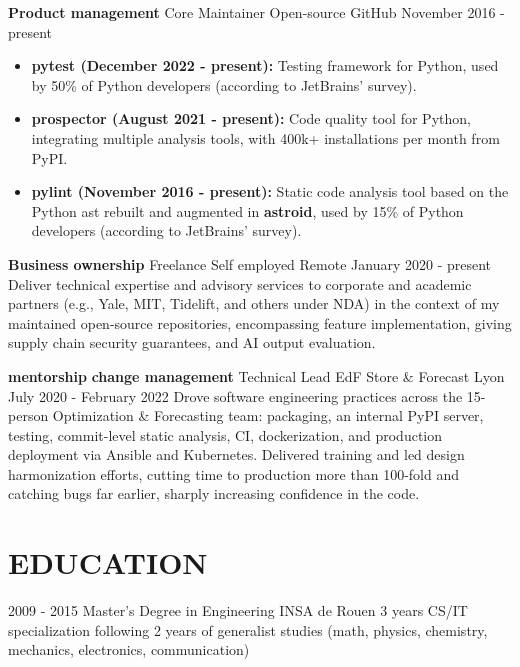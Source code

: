 \documentclass[11pt,a4paper]{moderncv}
\begin{document}
    \cventry
    {\textbf{Product management}}
    {Core Maintainer}
    {Open-source}
    {GitHub}
    {November 2016 - present}{
      \begin{itemize}
          \item \textbf{pytest (December 2022 - present):} Testing framework for Python, used by 50\% of Python developers (according to JetBrains' survey).
          \item \textbf{prospector (August 2021 - present):} Code quality tool for Python, integrating multiple analysis tools, with
            400k+ installations per month from PyPI.
          \item \textbf{pylint (November 2016 - present):} Static code analysis tool based on the Python ast
            rebuilt and augmented in \textbf{astroid}, used by 15\% of Python developers (according to JetBrains' survey).
      \end{itemize}
    }

    \cventry
    {\textbf{Business ownership}}
    {Freelance}
    {Self employed}
    {Remote}
    {January 2020 - present}{
        Deliver technical expertise and advisory services to corporate and academic partners
        (e.g., Yale, MIT, Tidelift, and others under NDA) in the context of my maintained
        open-source repositories, encompassing feature implementation, giving supply chain
        security guarantees, and AI output evaluation.
    }

  \cventry
    {\textbf{mentorship} \textbf{change management}}
    {Technical Lead}
    {EdF Store \& Forecast}
    {Lyon}
    {July 2020 - February 2022}{
      Drove software engineering practices across the 15-person Optimization
      \& Forecasting team: packaging, an internal PyPI server, testing,
      commit-level static analysis, CI, dockerization, and production deployment
      via Ansible and Kubernetes. Delivered training and led design harmonization
      efforts, cutting time to production more than 100-fold and catching bugs
      far earlier, sharply increasing confidence in the code.
    }

  \vspace{5mm}

  \section{EDUCATION}\label{sec:education}
  \cventry
    {2009 - 2015}
    {Master's Degree in Engineering}
    {INSA de Rouen}
    {3 years CS/IT specialization following 2 years of generalist studies
        (math, physics, chemistry, mechanics, electronics, communication)}
	{}{}
\end{document}
